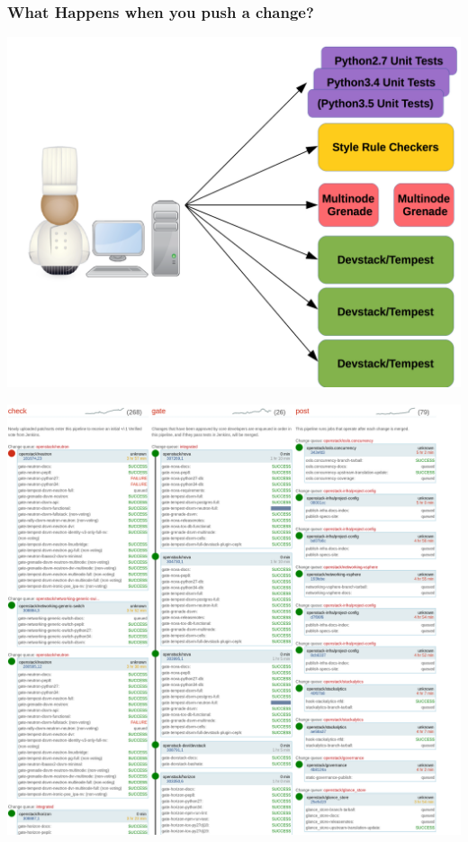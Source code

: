 \documentclass[aspectratio=43,11pt,hyperref={colorlinks=true}]{beamer}
\begin{document}
\begin{frame}
\frametitle{What Happens when you push a change?}
\begin{center}
	\includegraphics[width=.7\textwidth]{jobs.png}
\end{center}
\end{frame}

\begin{frame}
\begin{center}
    \includegraphics[width=.8\textwidth]{ZuulStatus.png}
\end{center}
\end{frame}
\end{document}
